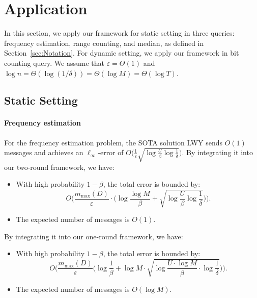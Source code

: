 \section{Application}
In this section, we apply our framework for static setting in three queries: frequency estimation, range counting, and median, as defined in Section~\ref{sec:Notation}.
For dynamic setting, we apply our framework in bit counting query. We assume that $\varepsilon = \Theta(1)$ and $\log n = \Theta(\log(1/\delta)) = \Theta(\log M)= \Theta(\log T)$.



\subsection{Static Setting}


\paragraph{Frequency estimation}


For the frequency estimation problem, the SOTA solution LWY \cite{luo2022frequency} sends $O(1)$ messages and achieves an $\ell_{\infty}$-error of
$O\big(\tfrac{1}{\varepsilon}\sqrt{\log \tfrac{U}{\beta} \log \tfrac{1}{\delta}}\big)$.
By integrating it into our two-round framework, we have:
\begin{itemize}
\item With high probability $1-\beta$, the total error is bounded by: 
$$
O\Big(\frac{m_{\max}(D)}{\varepsilon}\cdot \big(\log\frac{\log M}{\beta}+\sqrt{\log \frac{U}{\beta}\log\frac{1}{\delta}}\big)\Big).
$$
\item The expected number of messages is $O(1)$.
\end{itemize}

By integrating it into our one-round framework, we have:

\begin{itemize}
\item With high probability $1-\beta$, the total error is bounded by: 
$$
O\Big(\frac{m_{\max}(D)}{\varepsilon}\big(\log \frac{1}{\beta}+\log M \cdot \sqrt{
\log \frac{U\cdot\log M }{\beta}
\cdot \log \frac{1}{\delta} }\big)\Big).
$$

\item The expected number of messages is $O(\log M)$.
\end{itemize}



